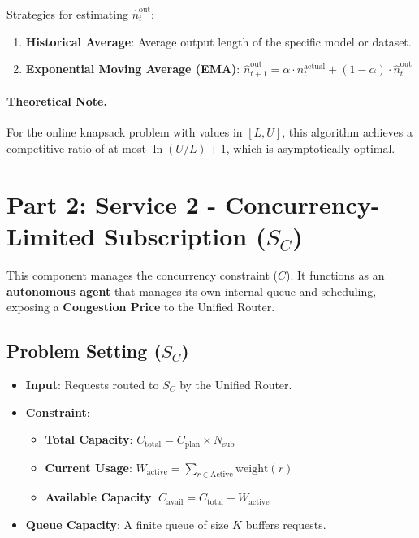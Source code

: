 \documentclass[11pt]{article}
\begin{document}
Strategies for estimating $\hat{n}_t^{\text{out}}$:
\begin{enumerate}
  \item \textbf{Historical Average}: Average output length of the specific model or dataset.
  \item \textbf{Exponential Moving Average (EMA)}: $\hat{n}_{t+1}^{\text{out}} = \alpha \cdot n_t^{\text{actual}} + (1-\alpha) \cdot \hat{n}_t^{\text{out}}$
\end{enumerate}

\paragraph{Theoretical Note.}
For the online knapsack problem with values in $[L, U]$, this algorithm achieves a competitive ratio of at most $\ln(U/L) + 1$, which is asymptotically optimal.

\section{Part 2: Service 2 - Concurrency-Limited Subscription ($S_C$)}
\label{sec:part2}

This component manages the concurrency constraint ($C$). It functions as an \textbf{autonomous agent} that manages its own internal queue and scheduling, exposing a \textbf{Congestion Price} to the Unified Router.

\subsection{Problem Setting ($S_C$)}

\begin{itemize}
  \item \textbf{Input}: Requests routed to $S_C$ by the Unified Router.
  \item \textbf{Constraint}:
    \begin{itemize}
      \item \textbf{Total Capacity}: $C_{\text{total}} = C_{\text{plan}} \times N_{\text{sub}}$
      \item \textbf{Current Usage}: $W_{\text{active}} = \sum_{r \in \text{Active}} \text{weight}(r)$
      \item \textbf{Available Capacity}: $C_{\text{avail}} = C_{\text{total}} - W_{\text{active}}$
    \end{itemize}
  \item \textbf{Queue Capacity}: A finite queue of size $K$ buffers requests.
\end{itemize}
\end{document}
